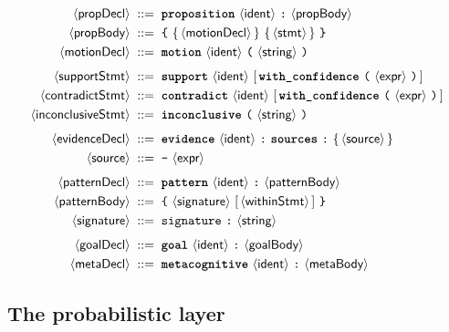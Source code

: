 \documentclass[11pt,a4paper]{article}
\theoremstyle{plain}
\theoremstyle{definition}
\theoremstyle{remark}
\newcommand{\nt}[1]{\ensuremath{\langle\textsf{#1}\rangle}}  %
\newcommand{\tm}[1]{\textbf{\texttt{#1}}}                 %
\newcommand{\opt}[1]{\ensuremath{[\,#1\,]}}               %
\newcommand{\rep}[1]{\ensuremath{\{\,#1\,\}}}             %
\newcommand{\bnfeq}{\;::=\;}
\begin{document}
\begin{align*}
\nt{propDecl}  &\bnfeq \tm{proposition}\ \nt{ident}\ \texttt{:}\
                       \nt{propBody}\\
\nt{propBody}  &\bnfeq \texttt{\{}\ \rep{\nt{motionDecl}}\ \rep{\nt{stmt}}\
                       \texttt{\}}\\
\nt{motionDecl}&\bnfeq \tm{motion}\ \nt{ident}\
                       \texttt{(}\ \nt{string}\ \texttt{)}\\[4pt]
\nt{supportStmt}&\bnfeq \tm{support}\ \nt{ident}\
                       \opt{\tm{with\_confidence}\ \texttt{(}\ \nt{expr}\
                       \texttt{)}}\\
\nt{contradictStmt}&\bnfeq \tm{contradict}\ \nt{ident}\
                       \opt{\tm{with\_confidence}\ \texttt{(}\ \nt{expr}\
                       \texttt{)}}\\
\nt{inconclusiveStmt}&\bnfeq \tm{inconclusive}\
                       \texttt{(}\ \nt{string}\ \texttt{)}\\[4pt]
\nt{evidenceDecl}&\bnfeq \tm{evidence}\ \nt{ident}\ \texttt{:}\
                       \tm{sources}\ \texttt{:}\ \rep{\nt{source}}\\
\nt{source}    &\bnfeq \texttt{-}\ \nt{expr}\\[4pt]
\nt{patternDecl}&\bnfeq \tm{pattern}\ \nt{ident}\ \texttt{:}\
                       \nt{patternBody}\\
\nt{patternBody}&\bnfeq \texttt{\{}\ \nt{signature}\ \opt{\nt{withinStmt}}\
                       \texttt{\}}\\
\nt{signature} &\bnfeq \texttt{signature}\ \texttt{:}\ \nt{string}\\[4pt]
\nt{goalDecl}  &\bnfeq \tm{goal}\ \nt{ident}\ \texttt{:}\ \nt{goalBody}\\
\nt{metaDecl}  &\bnfeq \tm{metacognitive}\ \nt{ident}\ \texttt{:}\
                       \nt{metaBody}
\end{align*}

\subsection{The probabilistic layer}
\end{document}
